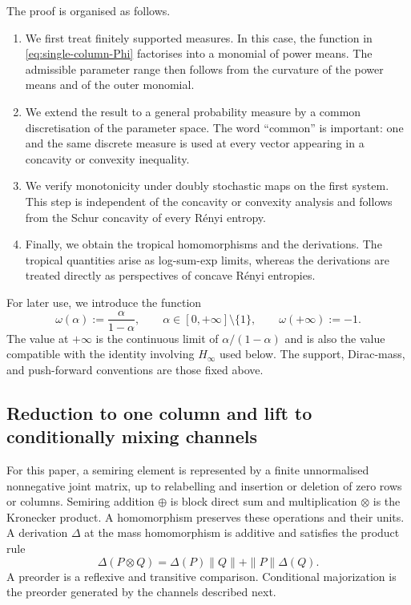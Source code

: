 \documentclass[aps,pra,11pt,onecolumn,nofootinbib,tightenlines]{revtex4-2}
\theoremstyle{definition}
\begin{document}
The proof is organised as follows.
\begin{enumerate}
 \item We first treat finitely supported measures. In this case, the function in \eqref{eq:single-column-Phi} factorises into a monomial of power means. The admissible parameter range then follows from the curvature of the power means and of the outer monomial.
 \item We extend the result to a general probability measure by a common discretisation of the parameter space. The word ``common'' is important: one and the same discrete measure is used at every vector appearing in a concavity or convexity inequality.
 \item We verify monotonicity under doubly stochastic maps on the first system. This step is independent of the concavity or convexity analysis and follows from the Schur concavity of every R\'enyi entropy.
 \item Finally, we obtain the tropical homomorphisms and the derivations. The tropical quantities arise as log-sum-exp limits, whereas the derivations are treated directly as perspectives of concave R\'enyi entropies.
\end{enumerate}

For later use, we introduce the function
\begin{equation}
 \omega(\alpha):=\frac{\alpha}{1-\alpha},
 \qquad \alpha\in[0,+\infty]\setminus\{1\},
 \qquad
 \omega(+\infty):=-1.
 \label{eq:def-omega}
\end{equation}
The value at $+\infty$ is the continuous limit of $\alpha/(1-\alpha)$ and is also the value compatible with the identity involving $H_\infty$ used below.
The support, Dirac-mass, and push-forward conventions are those fixed above.

\subsection{Reduction to one column and lift to conditionally mixing channels}
\label{sec:channel-lift}

For this paper, a semiring element is represented by a finite unnormalised
nonnegative joint matrix, up to relabelling and insertion or deletion of zero
rows or columns.  Semiring addition $\oplus$ is block direct sum and multiplication
$\otimes$ is the Kronecker product.  A homomorphism preserves these operations
and their units.  A derivation $\Delta$ at the mass homomorphism is additive and
satisfies the product rule
\begin{equation}
 \Delta(P\otimes Q)
 =\Delta(P)\|Q\|+\|P\|\Delta(Q).
 \label{eq:derivation-product-rule-standing}
\end{equation}
A preorder is a reflexive and transitive comparison.  Conditional majorization
is the preorder generated by the channels described next.
\end{document}
